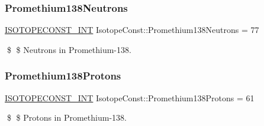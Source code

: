 \subsubsection{\texorpdfstring{Promethium138\+Neutrons}{Promethium138Neutrons}}
{\footnotesize\ttfamily \mbox{\hyperlink{group___isotope_const-_macros_ga5f18360b3e99483a35c32d789e62621c}{I\+S\+O\+T\+O\+P\+E\+C\+O\+N\+S\+T\+\_\+\+I\+NT}} Isotope\+Const\+::\+Promethium138\+Neutrons = 77}

\$ \$ Neutrons in Promethium-\/138. \mbox{\label{group___isotope_const-_promethium-_pm138_gadeb5deba23b1aa231e5b5a5f015ab556}} 
\subsubsection{\texorpdfstring{Promethium138\+Protons}{Promethium138Protons}}
{\footnotesize\ttfamily \mbox{\hyperlink{group___isotope_const-_macros_ga5f18360b3e99483a35c32d789e62621c}{I\+S\+O\+T\+O\+P\+E\+C\+O\+N\+S\+T\+\_\+\+I\+NT}} Isotope\+Const\+::\+Promethium138\+Protons = 61}

\$ \$ Protons in Promethium-\/138. 